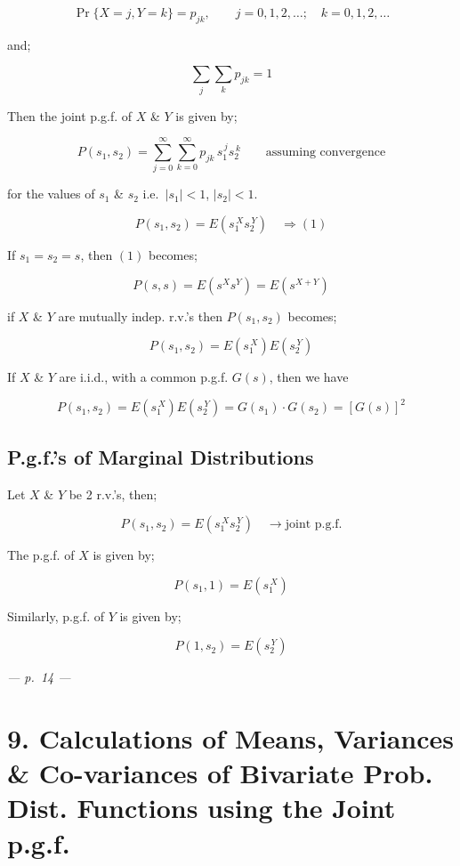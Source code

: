 \documentclass[
]{article}
\begin{document}
\[\Pr\{X = j, Y = k\} = p_{jk}, \qquad j = 0, 1, 2, \ldots; \quad k = 0, 1, 2, \ldots\]

and;

\[\sum_j \sum_k p_{jk} = 1\]

Then the joint p.g.f. of \(X\) \& \(Y\) is given by;

\[P(s_1, s_2) = \sum_{j=0}^{\infty} \sum_{k=0}^{\infty} p_{jk}\, s_1^{\,j} s_2^{\,k} \qquad \text{assuming convergence}\]

for the values of \(s_1\) \& \(s_2\) i.e.~\(|s_1| < 1\), \(|s_2| < 1\).

\[P(s_1, s_2) = E\left(s_1^{\,X} s_2^{\,Y}\right) \quad \Rightarrow (1)\]

If \(s_1 = s_2 = s\), then \((1)\) becomes;

\[P(s, s) = E\left(s^X s^Y\right) = E\left(s^{X+Y}\right)\]

if \(X\) \& \(Y\) are mutually indep. r.v.'s then \(P(s_1, s_2)\)
becomes;

\[P(s_1, s_2) = E\left(s_1^{\,X}\right) E\left(s_2^{\,Y}\right)\]

If \(X\) \& \(Y\) are i.i.d., with a common p.g.f. \(G(s)\), then we
have

\[P(s_1, s_2) = E\left(s_1^{\,X}\right) E\left(s_2^{\,Y}\right) = G(s_1) \cdot G(s_2) = \left[G(s)\right]^2\]

\subsection{P.g.f.'s of Marginal
Distributions}\label{p.g.f.s-of-marginal-distributions}

Let \(X\) \& \(Y\) be 2 r.v.'s, then;

\[P(s_1, s_2) = E\left(s_1^{\,X} s_2^{\,Y}\right) \quad \rightarrow \text{joint p.g.f.}\]

The p.g.f. of \(X\) is given by;

\[P(s_1, 1) = E\left(s_1^{\,X}\right)\]

Similarly, p.g.f. of \(Y\) is given by;

\[P(1, s_2) = E\left(s_2^{\,Y}\right)\]

\emph{--- p.~14 ---}

\section{9. Calculations of Means, Variances \& Co-variances of
Bivariate Prob. Dist. Functions using the Joint
p.g.f.}\label{calculations-of-means-variances-co-variances-of-bivariate-prob.-dist.-functions-using-the-joint-p.g.f.}
\end{document}
